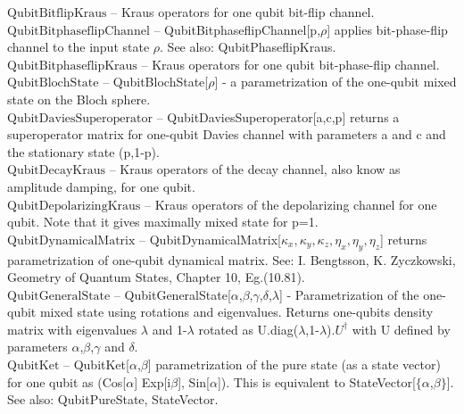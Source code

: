 \documentclass[a4paper,10pt]{scrartcl}
\begin{document}
\textbf{$ \text{QubitBitflipKraus} $ }-- Kraus operators for one qubit bit-flip channel.$  $\\

\textbf{$ \text{QubitBitphaseflipChannel} $ }-- QubitBitphaseflipChannel[p,$\rho $] applies bit-phase-flip channel to the input state $\rho $. See also: QubitPhaseflipKraus.$  $\\

\textbf{$ \text{QubitBitphaseflipKraus} $ }-- Kraus operators for one qubit bit-phase-flip channel.$  $\\

\textbf{$ \text{QubitBlochState} $ }-- QubitBlochState[$\rho $] - a parametrization of the one-qubit mixed state on the Bloch sphere.$  $\\

\textbf{$ \text{QubitDaviesSuperoperator} $ }-- QubitDaviesSuperoperator[a,c,p] returns a superoperator matrix for one-qubit Davies channel with parameters a and c and the stationary state (p,1-p).$  $\\

\textbf{$ \text{QubitDecayKraus} $ }-- Kraus operators of the decay channel, also know as amplitude damping, for one qubit.$  $\\

\textbf{$ \text{QubitDepolarizingKraus} $ }-- Kraus operators of the depolarizing channel for one qubit. Note that it gives maximally mixed state for p=1.$  $\\

\textbf{$ \text{QubitDynamicalMatrix} $ }-- QubitDynamicalMatrix[$ \kappa _x,\kappa _y,\kappa _z,\eta _x,\eta _y,\eta _z $] returns parametrization of one-qubit dynamical matrix. See: I. Bengtsson, K. Zyczkowski, Geometry of Quantum States, Chapter 10, Eg.(10.81).$  $\\

\textbf{$ \text{QubitGeneralState} $ }-- QubitGeneralState[$\alpha $,$\beta $,$\gamma $,$\delta $,$\lambda $] - Parametrization of the one-qubit mixed state using rotations and eigenvalues. Returns one-qubits density matrix with eigenvalues $\lambda $ and 1-$\lambda $ rotated as U.diag($\lambda $,1-$\lambda $).$ U^{\dagger } $ with U defined by parameters $\alpha $,$\beta $,$\gamma $ and $\delta $.$  $\\

\textbf{$ \text{QubitKet} $ }-- QubitKet[$\alpha $,$\beta $] parametrization of the pure state (as a state vector) for one qubit as (Cos[$\alpha $] Exp[i$\beta $], Sin[$\alpha $]). This is equivalent to StateVector[$\{\alpha $,$\beta \}$]. See also: QubitPureState, StateVector.$  $\\
\end{document}
